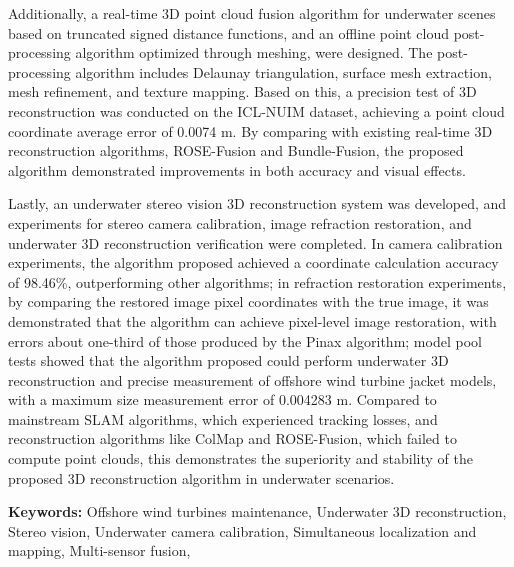 Additionally, a real-time 3D point cloud fusion algorithm for underwater scenes based on truncated signed distance functions, and an offline point cloud post-processing algorithm optimized through meshing, were designed.
The post-processing algorithm includes Delaunay triangulation, surface mesh extraction, mesh refinement, and texture mapping.
Based on this, a precision test of 3D reconstruction was conducted on the ICL-NUIM dataset, achieving a point cloud coordinate average error of 0.0074 m. By comparing with existing real-time 3D reconstruction algorithms, ROSE-Fusion and Bundle-Fusion, the proposed algorithm demonstrated improvements in both accuracy and visual effects.

Lastly, an underwater stereo vision 3D reconstruction system was developed, and experiments for stereo camera calibration, image refraction restoration, and underwater 3D reconstruction verification were completed.
In camera calibration experiments, the algorithm proposed achieved a coordinate calculation accuracy of 98.46\%, outperforming other algorithms; in refraction restoration experiments, by comparing the restored image pixel coordinates with the true image, it was demonstrated that the algorithm can achieve pixel-level image restoration, with errors about one-third of those produced by the Pinax algorithm; model pool tests showed that the algorithm proposed could perform underwater 3D reconstruction and precise measurement of offshore wind turbine jacket models, with a maximum size measurement error of 0.004283 m. Compared to mainstream SLAM algorithms, which experienced tracking losses, and reconstruction algorithms like ColMap and ROSE-Fusion, which failed to compute point clouds, this demonstrates the superiority and stability of the proposed 3D reconstruction algorithm in underwater scenarios.\newline


\noindent \textbf{Keywords:} Offshore wind turbines maintenance, Underwater 3D reconstruction, Stereo vision, Underwater camera calibration, Simultaneous localization and mapping, Multi-sensor fusion, 